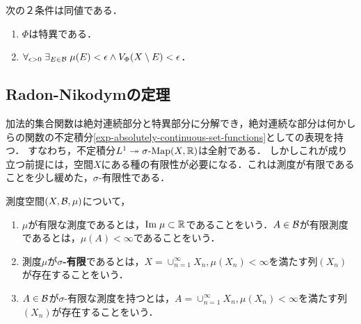 \documentclass[uplatex, dvipdfmx]{jsreport}
\begin{document}
\begin{theorem}
    次の２条件は同値である．
    \begin{enumerate}
        \item $\Phi$は特異である．
        \item $\forall_{\epsilon>0}\;\exists_{E\in\mathcal{B}}\;\mu(E)<\epsilon\land V_\Phi(X\setminus E)<\epsilon$．
    \end{enumerate}
\end{theorem}

\subsection{Radon-Nikodymの定理}

\begin{tcolorbox}[colframe=ForestGreen, colback=ForestGreen!10!white,breakable,colbacktitle=ForestGreen!40!white,coltitle=black,fonttitle=\bfseries\sffamily,
title=]
    加法的集合関数は絶対連続部分と特異部分に分解でき，絶対連続な部分は何かしらの関数の不定積分\ref{exp-absolutely-continuous-set-functions}としての表現を持つ．
    すなわち，不定積分$L^1\twoheadrightarrow\sigma\textrm{-}\mathrm{Map}(X,\mathbb{R})$は全射である．
    しかしこれが成り立つ前提には，空間$X$にある種の有限性が必要になる．これは測度が有限であることを少し緩めた，$\sigma$-有限性である．
\end{tcolorbox}

\begin{definition}
    測度空間$(X,\mathcal{B},\mu)$について，
    \begin{enumerate}
        \item $\mu$が有限な測度であるとは，$\mathrm{Im}\;\mu\subset\mathbb{R}$であることをいう．$A\in\mathcal{B}$が有限測度であるとは，$\mu(A)<\infty$であることをいう．
        \item 測度$\mu$が\textbf{$\sigma$-有限}であるとは，$X=\cup^\infty_{n=1}X_n,\mu(X_n)<\infty$を満たす列$(X_n)$が存在することをいう．
        \item $A\in\mathcal{B}$が$\sigma$-有限な測度を持つとは，$A=\cup^\infty_{n=1}X_n,\mu(X_n)<\infty$を満たす列$(X_n)$が存在することをいう．
    \end{enumerate}
\end{definition}
\end{document}
